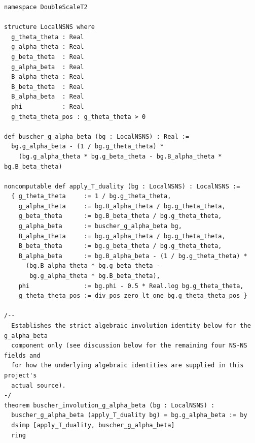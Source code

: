\documentclass[11pt,a4paper]{article}
\begin{document}
\begin{lstlisting}[language=lean, caption={Illustrative $\mathbb{R}$-instantiated presentation of the local Buscher rules and one component of their algebraic involution (see text for the remaining four fields); the repository source, \texttt{proofs/LeanscratchDB/DoubleScaleT2.lean}, instead uses an abstract carrier type with assumed field identities, as discussed below, and is separate from the kernel-checked LeanMaster foundation}]
namespace DoubleScaleT2

structure LocalNSNS where
  g_theta_theta : Real
  g_alpha_theta : Real
  g_beta_theta  : Real
  g_alpha_beta  : Real
  B_alpha_theta : Real
  B_beta_theta  : Real
  B_alpha_beta  : Real
  phi           : Real
  g_theta_theta_pos : g_theta_theta > 0

def buscher_g_alpha_beta (bg : LocalNSNS) : Real :=
  bg.g_alpha_beta - (1 / bg.g_theta_theta) *
    (bg.g_alpha_theta * bg.g_beta_theta - bg.B_alpha_theta * bg.B_beta_theta)

noncomputable def apply_T_duality (bg : LocalNSNS) : LocalNSNS :=
  { g_theta_theta     := 1 / bg.g_theta_theta,
    g_alpha_theta     := bg.B_alpha_theta / bg.g_theta_theta,
    g_beta_theta      := bg.B_beta_theta / bg.g_theta_theta,
    g_alpha_beta      := buscher_g_alpha_beta bg,
    B_alpha_theta     := bg.g_alpha_theta / bg.g_theta_theta,
    B_beta_theta      := bg.g_beta_theta / bg.g_theta_theta,
    B_alpha_beta      := bg.B_alpha_beta - (1 / bg.g_theta_theta) *
      (bg.B_alpha_theta * bg.g_beta_theta -
       bg.g_alpha_theta * bg.B_beta_theta),
    phi               := bg.phi - 0.5 * Real.log bg.g_theta_theta,
    g_theta_theta_pos := div_pos zero_lt_one bg.g_theta_theta_pos }

/--
  Establishes the strict algebraic involution identity below for the g_alpha_beta
  component only (see discussion below for the remaining four NS-NS fields and
  for how the underlying algebraic identities are supplied in this project's
  actual source).
-/
theorem buscher_involution_g_alpha_beta (bg : LocalNSNS) :
  buscher_g_alpha_beta (apply_T_duality bg) = bg.g_alpha_beta := by
  dsimp [apply_T_duality, buscher_g_alpha_beta]
  ring
\end{lstlisting}
\end{document}
